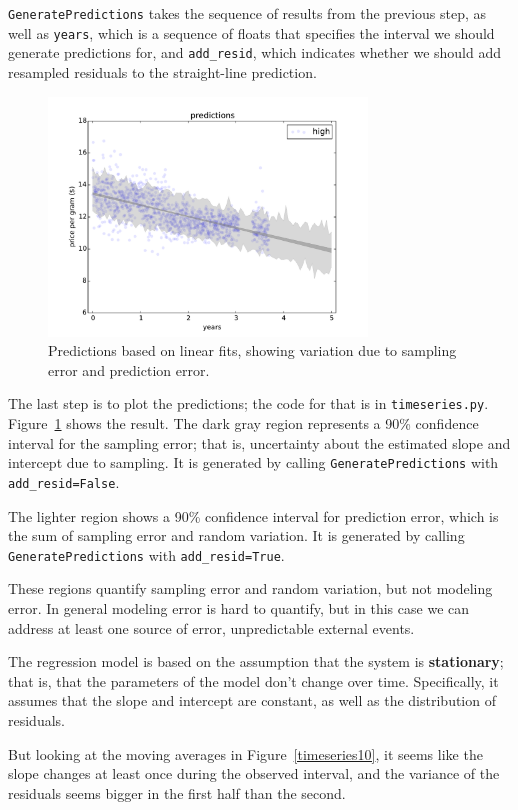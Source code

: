 \documentclass[12pt]{book}
\begin{document}
{\tt GeneratePredictions} takes the sequence of results from the
previous step, as well as {\tt years}, which is a sequence of
floats that specifies the interval we should generate predictions for,
and \verb"add_resid", which indicates whether we should add resampled
residuals to the straight-line prediction.

\begin{figure}
\centerline{\includegraphics[height=2.5in]{figs/timeseries4.pdf}}
\caption{Predictions based on linear fits, showing variation due
to sampling error and prediction error.}
\label{timeseries4}
\end{figure}

The last step is to plot the predictions; the code for that is
in {\tt timeseries.py}.  Figure~\ref{timeseries4} shows the result.
The dark gray region represents a 90\% confidence interval for
the sampling error; that is, uncertainty about the estimated
slope and intercept due to sampling.  It is generated by calling
{\tt GeneratePredictions} with \verb"add_resid=False".

The lighter region shows
a 90\% confidence interval for prediction error, which is the
sum of sampling error and random variation.  It is generated by calling
{\tt GeneratePredictions} with \verb"add_resid=True".

These regions quantify sampling error and random variation, but
not modeling error.  In general modeling error is hard to quantify,
but in this case we can address at least one source of error,
unpredictable external events.

The regression model is based on the assumption that the system
is {\bf stationary}; that is, that the parameters of the model
don't change over time.
Specifically, it assumes that the slope and
intercept are constant, as well as the distribution of residuals.

But looking at the moving averages in Figure~\ref{timeseries10}, it
seems like the slope changes at least once during the observed
interval, and the variance of the residuals seems bigger in the first
half than the second.
\end{document}
